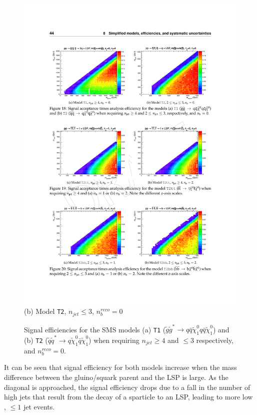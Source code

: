 \begin{figure}[ht]
\begin{minipage}[b]{0.45\linewidth}
\includegraphics[width = 1.0\linewidth]{plots/t2_signal_eff.pdf}
\centering(b)  Model \texttt{T2}, $n_{jet} \leq 3$, $n_{b}^{reco} = 0$ 
\end{minipage}
\caption[Signal efficiencies fo the \ac{SMS} models (a) \texttt{T1} and (b) \texttt{T2}.]{Signal efficiencies for the \ac{SMS} models (a) \texttt{T1} ($\widetilde{g}\widetilde{g}^{*}\rightarrow q\bar{q}\widetilde{\chi}^{0}_{1}q\bar{q}\widetilde{\chi}^{0}_{1}$) and (b) \texttt{T2} ($ \widetilde{q}\widetilde{q}^{*} \rightarrow q\widetilde{\chi}^{0}_{1}\bar{q}\widetilde{\chi}^{0}_{1}$) when requiring $n_{jet} \geq 4$ and $\leq 3$ respectively, and $n_{b}^{reco} = 0$.}
\label{fig:smsefficiencyplots}
\end{figure}

It can be seen that signal efficiency for both models increase when the mass difference between the gluino/squark parent and the \ac{LSP} is large. As the diagonal is approached, the signal efficiency drops due to a fall in the number of high \pt jets that result from the decay of a sparticle to an \ac{LSP}, leading to more low \theht, $\leq 1$ jet events.


